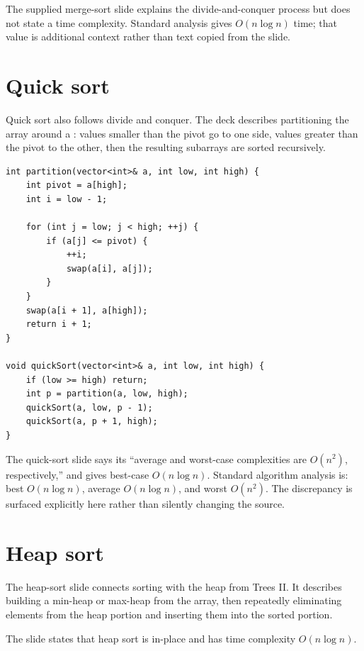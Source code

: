 \begin{clarification}
The supplied merge-sort slide explains the divide-and-conquer process but does not state a time complexity. Standard analysis gives $O(n\log n)$ time; that value is additional context rather than text copied from the slide.
\end{clarification}

\section{Quick sort}

Quick sort also follows divide and conquer. The deck describes partitioning the array around a : values smaller than the pivot go to one side, values greater than the pivot to the other, then the resulting subarrays are sorted recursively.

\begin{lstlisting}
int partition(vector<int>& a, int low, int high) {
    int pivot = a[high];
    int i = low - 1;

    for (int j = low; j < high; ++j) {
        if (a[j] <= pivot) {
            ++i;
            swap(a[i], a[j]);
        }
    }
    swap(a[i + 1], a[high]);
    return i + 1;
}

void quickSort(vector<int>& a, int low, int high) {
    if (low >= high) return;
    int p = partition(a, low, high);
    quickSort(a, low, p - 1);
    quickSort(a, p + 1, high);
}
\end{lstlisting}

\begin{clarification}
The quick-sort slide says its ``average and worst-case complexities are $O(n^2)$, respectively,'' and gives best-case $O(n\log n)$. Standard algorithm analysis is: best $O(n\log n)$, average $O(n\log n)$, and worst $O(n^2)$. The discrepancy is surfaced explicitly here rather than silently changing the source.
\end{clarification}

\section{Heap sort}

The heap-sort slide connects sorting with the heap from Trees II. It describes building a min-heap or max-heap from the array, then repeatedly eliminating elements from the heap portion and inserting them into the sorted portion.

The slide states that heap sort is in-place and has time complexity $O(n\log n)$.

